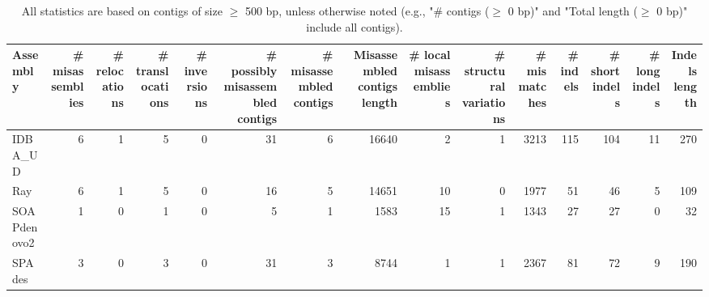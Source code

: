 \documentclass[12pt,a4paper]{article}
\begin{document}
\begin{table}[ht]
\begin{center}
\caption{All statistics are based on contigs of size $\geq$ 500 bp, unless otherwise noted (e.g., "\# contigs ($\geq$ 0 bp)" and "Total length ($\geq$ 0 bp)" include all contigs).}
\begin{tabular}{|l*{14}{|r}|}
\hline
Assembly & \# misassemblies &     \# relocations &     \# translocations &     \# inversions & \# possibly misassembled contigs & \# misassembled contigs & Misassembled contigs length & \# local misassemblies & \# structural variations & \# mismatches & \# indels &     \# short indels &     \# long indels & Indels length \\ \hline
IDBA\_UD & 6 & 1 & 5 & 0 & 31 & 6 & 16640 & 2 & 1 & 3213 & 115 & 104 & 11 & 270 \\ \hline
Ray & 6 & 1 & 5 & 0 & 16 & 5 & 14651 & 10 & 0 & 1977 & 51 & 46 & 5 & 109 \\ \hline
SOAPdenovo2 & 1 & 0 & 1 & 0 & 5 & 1 & 1583 & 15 & 1 & 1343 & 27 & 27 & 0 & 32 \\ \hline
SPAdes & 3 & 0 & 3 & 0 & 31 & 3 & 8744 & 1 & 1 & 2367 & 81 & 72 & 9 & 190 \\ \hline
\end{tabular}
\end{center}
\end{table}
\end{document}
